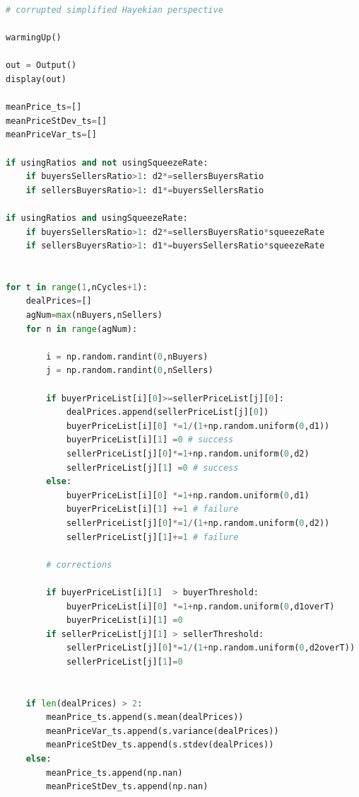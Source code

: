 \documentclass[10pt]{report}
\begin{document}
\begin{appendices}
\begin{lstlisting}[language=Python, caption=The model in the corrupted simplified Hayekian perspective, 
label={The listing of model in the corrupted simplified Hayekian perspective},basicstyle=\ttfamily\footnotesize]
# corrupted simplified Hayekian perspective

warmingUp()

out = Output()
display(out)

meanPrice_ts=[]
meanPriceStDev_ts=[]
meanPriceVar_ts=[]

if usingRatios and not usingSqueezeRate:
    if buyersSellersRatio>1: d2*=sellersBuyersRatio
    if sellersBuyersRatio>1: d1*=buyersSellersRatio
        
if usingRatios and usingSqueezeRate:
    if buyersSellersRatio>1: d2*=sellersBuyersRatio*squeezeRate
    if sellersBuyersRatio>1: d1*=buyersSellersRatio*squeezeRate


for t in range(1,nCycles+1):    
    dealPrices=[]
    agNum=max(nBuyers,nSellers)
    for n in range(agNum):

        i = np.random.randint(0,nBuyers)
        j = np.random.randint(0,nSellers)
        
        if buyerPriceList[i][0]>=sellerPriceList[j][0]:
            dealPrices.append(sellerPriceList[j][0])
            buyerPriceList[i][0] *=1/(1+np.random.uniform(0,d1))
            buyerPriceList[i][1] =0 # success
            sellerPriceList[j][0]*=1+np.random.uniform(0,d2)
            sellerPriceList[j][1] =0 # success
        else:
            buyerPriceList[i][0] *=1+np.random.uniform(0,d1)
            buyerPriceList[i][1] +=1 # failure
            sellerPriceList[j][0]*=1/(1+np.random.uniform(0,d2))
            sellerPriceList[j][1]+=1 # failure
            
        # corrections
        
        if buyerPriceList[i][1]  > buyerThreshold:
            buyerPriceList[i][0] *=1+np.random.uniform(0,d1overT)
            buyerPriceList[i][1] =0
        if sellerPriceList[j][1] > sellerThreshold:
            sellerPriceList[j][0]*=1/(1+np.random.uniform(0,d2overT))
            sellerPriceList[j][1]=0
           
           
    if len(dealPrices) > 2:
        meanPrice_ts.append(s.mean(dealPrices))
        meanPriceVar_ts.append(s.variance(dealPrices))
        meanPriceStDev_ts.append(s.stdev(dealPrices))
    else:
        meanPrice_ts.append(np.nan)
        meanPriceStDev_ts.append(np.nan)
        

\end{lstlisting}
\end{appendices}
\end{document}

